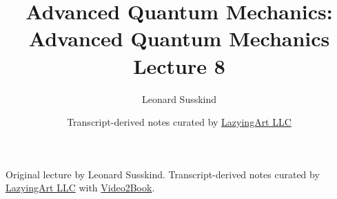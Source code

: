 \documentclass[11pt,oneside]{book}
\begin{document}
\hypersetup{pageanchor=false}
\frontmatter
\title{Advanced Quantum Mechanics: Advanced Quantum Mechanics Lecture 8}
\author{Leonard Susskind}
\date{Transcript-derived notes curated by \href{https://lazying.art}{LazyingArt LLC}}
\maketitle
\begin{center}
\small Original lecture by Leonard Susskind. Transcript-derived notes curated by \href{https://lazying.art}{LazyingArt LLC} with \href{https://github.com/lachlanchen/Video2Book}{Video2Book}.
\end{center}
\clearpage
\hypersetup{pageanchor=true}
\mainmatter

\end{document}
